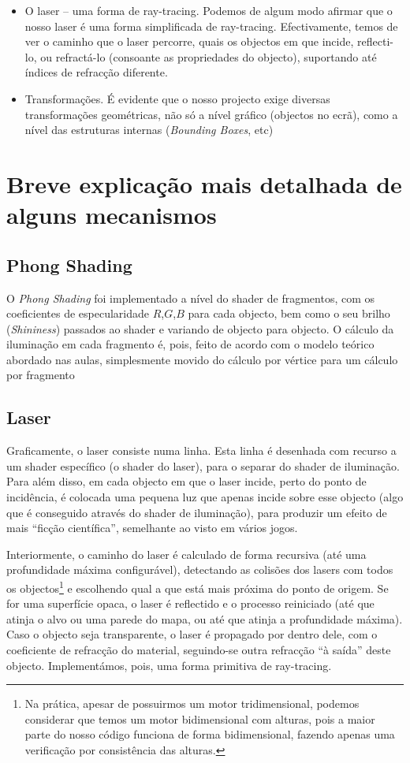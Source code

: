 \documentclass[11pt,a4paper]{article}
\begin{document}
\begin{itemize}
  \item O laser -- uma forma de ray-tracing. Podemos de algum modo afirmar que o nosso laser é uma forma simplificada de ray-tracing. Efectivamente, temos de ver o caminho que o laser percorre, quais os objectos em que incide, reflecti-lo, ou refractá-lo (consoante as propriedades do objecto), suportando até índices de refracção diferente.
  \item Transformações. É evidente que o nosso projecto exige diversas transformações geométricas, não só a nível gráfico (objectos no ecrã), como a nível das estruturas internas (\emph{Bounding Boxes}, etc)
\end{itemize}

\section{Breve explicação mais detalhada de alguns mecanismos}

\subsection{Phong Shading}

O \emph{Phong Shading} foi implementado a nível do shader de fragmentos, com os coeficientes de especularidade $R$,$G$,$B$ para cada objecto, bem como o seu brilho (\emph{Shininess}) passados ao shader e variando de objecto para objecto. O cálculo da iluminação em cada fragmento é, pois, feito de acordo com o modelo teórico abordado nas aulas, simplesmente movido do cálculo por vértice para um cálculo por fragmento

\subsection{Laser}

Graficamente, o laser consiste numa linha. Esta linha é desenhada com recurso a um shader específico (o shader do laser), para o separar do shader de iluminação. Para além disso, em cada objecto em que o laser incide, perto do ponto de incidência, é colocada uma pequena luz que apenas incide sobre esse objecto (algo que é conseguido através do shader de iluminação), para produzir um efeito de mais ``ficção científica'', semelhante ao visto em vários jogos.

Interiormente, o caminho do laser é calculado de forma recursiva (até uma profundidade máxima configurável), detectando as colisões dos lasers com todos os objectos\footnote{Na prática, apesar de possuirmos um motor tridimensional, podemos considerar que temos um motor bidimensional com alturas, pois a maior parte do nosso código funciona de forma bidimensional, fazendo apenas uma verificação por consistência das alturas.} e escolhendo qual a que está mais próxima do ponto de origem. Se for uma superfície opaca, o laser é reflectido e o processo reiniciado (até que atinja o alvo ou uma parede do mapa, ou até que atinja a profundidade máxima). Caso o objecto seja transparente, o laser é propagado por dentro dele, com o coeficiente de refracção do material, seguindo-se outra refracção ``à saída'' deste objecto. Implementámos, pois, uma forma primitiva de ray-tracing.
\end{document}
